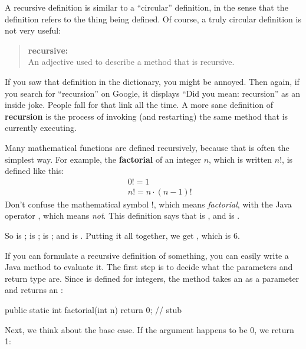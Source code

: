 A recursive definition is similar to a ``circular'' definition, in the sense that the definition refers to the thing being defined.
Of course, a truly circular definition is not very useful:

\begin{quote}
{\bf recursive:} \\
An adjective used to describe a method that is recursive.
\end{quote}


If you saw that definition in the dictionary, you might be annoyed.
Then again, if you search for ``recursion'' on Google, it displays ``Did you mean: recursion'' as an inside joke.
People fall for that link all the time.
A more sane definition of {\bf recursion} is the process of invoking (and restarting) the same method that is currently executing.


Many mathematical functions are defined recursively, because that is often the simplest way.
For example, the {\bf factorial} of an integer $n$, which is written $n!$, is defined like this:
%
\begin{eqnarray*}
&&  0! = 1 \\
&&  n! = n \cdot(n-1)!
\end{eqnarray*}
%
Don't confuse the mathematical symbol $!$, which means {\em factorial}, with the Java operator \java{!}, which means {\em not}.
This definition says that  is , and  is .

So  is ;  is ;  is ; and  is .
Putting it all together, we get , which is 6.

If you can formulate a recursive definition of something, you can easily write a Java method to evaluate it.
The first step is to decide what the parameters and return type are.
Since  is defined for integers, the method takes an  as a parameter and returns an :

\begin{code}
public static int factorial(int n) {
    return 0;  // stub
}
\end{code}

Next, we think about the base case.
If the argument happens to be 0, we return 1:

